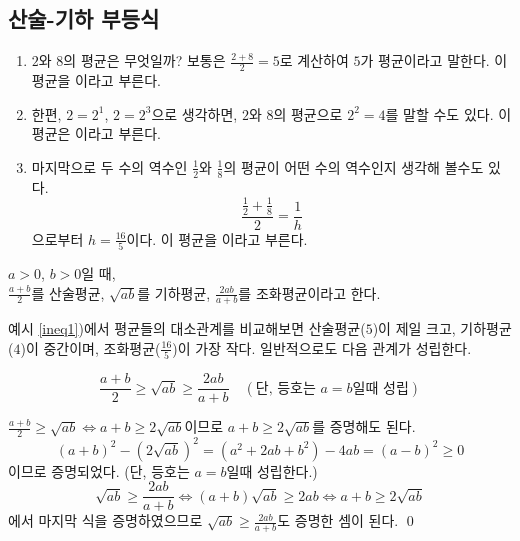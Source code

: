 \documentclass{oblivoir}
\begin{document}
%
\subsection{산술-기하 부등식}

%
\exam{}
\begin{enumerate}\label{ineq1}
\item
\(2\)와 \(8\)의 평균은 무엇일까?
보통은 \(\frac{2+8}2=5\)로 계산하여 \(5\)가 평균이라고 말한다.
이 평균을 이라고 부른다.
\item
한편, \(2=2^1\), \(2=2^3\)으로 생각하면, \(2\)와 \(8\)의 평균으로 \(2^2=4\)를 말할 수도 있다.
이 평균은 이라고 부른다.
\item
마지막으로 두 수의 역수인 \(\frac12\)와 \(\frac18\)의 평균이 어떤 수의 역수인지 생각해 볼수도 있다.
\[\frac{\frac12+\frac18}2=\frac1h\]
으로부터
\(h=\frac{16}5\)이다.
이 평균을 이라고 부른다.
\end{enumerate}

%
\label{ineq2}

\bigskip
\bigskip
\bigskip
\bigskip
\bigskip

\begin{mdframed}
%
\label{ineq3}
\(a>0\), \(b>0\)일 때,\\
\(\frac{a+b}2\)를 산술평균, \(\sqrt{ab}\)를 기하평균, \(\frac{2ab}{a+b}\)를 조화평균이라고 한다.\footnotemark
\end{mdframed}

\newpage
예시 \ref{ineq1})에서 평균들의 대소관계를 비교해보면 산술평균(\(5\))이 제일 크고, 기하평균(\(4\))이 중간이며, 조화평균(\(\frac{16}5\))이 가장 작다.
일반적으로도 다음 관계가 성립한다.
\begin{mdframed}
%
\label{ineq4}
\[\frac{a+b}2\ge\sqrt{ab}\ge\frac{2ab}{a+b}\quad(\text{단, 등호는 \(a=b\)일때 성립})\]
\end{mdframed}
\proo{}
\(\frac{a+b}2\ge\sqrt{ab}\iff a+b\ge2\sqrt{ab}\)이므로 \(a+b\ge2\sqrt{ab}\)를 증명해도 된다.
\[(a+b)^2-\left(2\sqrt{ab}\right)^2=(a^2+2ab+b^2)-4ab=(a-b)^2\ge0\]
이므로 증명되었다.
(단, 등호는 \(a=b\)일때 성립한다.)
\[\sqrt{ab}\ge\frac{2ab}{a+b}\iff(a+b)\sqrt{ab}\ge2ab\iff a+b\ge2\sqrt{ab}\]
에서 마지막 식을 증명하였으므로 \(\sqrt{ab}\ge\frac{2ab}{a+b}\)도 증명한 셈이 된다.
\qed
\end{document}
